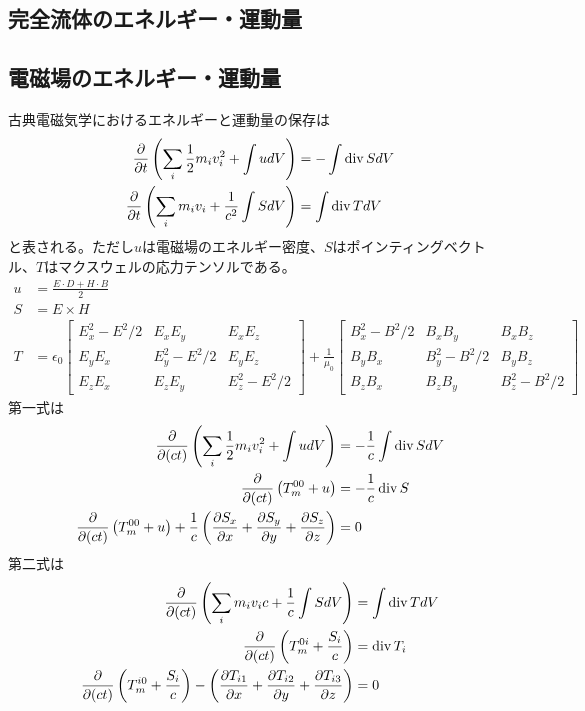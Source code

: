 \subsection{完全流体のエネルギー・運動量}

\subsection{電磁場のエネルギー・運動量}
    古典電磁気学におけるエネルギーと運動量の保存は
    \begin{align*}
        \pdv{t}\left(\sum_i \frac{1}{2}m_i v_i^2 + \int u dV\right) &= - \int \operatorname{div} S dV\\
        \pdv{t}\left(\sum_i m_i v_i + \frac{1}{c^2}\int S dV\right) &= \int \operatorname{div} T dV
    \end{align*}
    と表される。ただし$u$は電磁場のエネルギー密度、$S$はポインティングベクトル、$T$はマクスウェルの応力テンソルである。
    \begin{align*}
        u &= \frac{E \cdot D + H \cdot B}{2}\\
        S &= E \times H\\
        T &= \epsilon_0 \begin{bmatrix}
            E_x^2 - E^2/2 & E_xE_y & E_xE_z\\
            E_yE_x & E_y^2 - E^2/2 & E_yE_z\\
            E_zE_x & E_zE_y & E_z^2 - E^2/2
        \end{bmatrix}
        +
        \frac{1}{\mu_0} \begin{bmatrix}
            B_x^2 - B^2/2 & B_xB_y & B_xB_z\\
            B_yB_x & B_y^2 - B^2/2 & B_yB_z\\
            B_zB_x & B_zB_y & B_z^2 - B^2/2
        \end{bmatrix}
    \end{align*}
    第一式は
    \begin{align*}
        \pdv{(ct)}\left(\sum_i \frac{1}{2}m_iv_i^2 + \int u dV\right) &= -\frac{1}{c} \int \operatorname{div} S dV\\
        \pdv{(ct)}\left(T_m^{00} + u\right) &= - \frac{1}{c}\operatorname{div} S\\
        \pdv{(ct)}\left(T_m^{00} + u\right) + \frac{1}{c}\left(\pdv{S_x}{x} + \pdv{S_y}{y} + \pdv{S_z}{z}\right) &= 0
    \end{align*}
    第二式は
    \begin{align*}
        \pdv{(ct)}\left(\sum_i m_i v_i c + \frac{1}{c}\int S dV\right) &= \int \operatorname{div} T dV\\
        \pdv{(ct)}\left(T_m^{0i} + \frac{S_i}{c}\right) &= \operatorname{div} T_i\\
        \pdv{(ct)}\left(T_m^{i0} + \frac{S_i}{c}\right) - \left(\pdv{T_{i1}}{x} + \pdv{T_{i2}}{y} + \pdv{T_{i3}}{z}\right) &= 0
    \end{align*}
